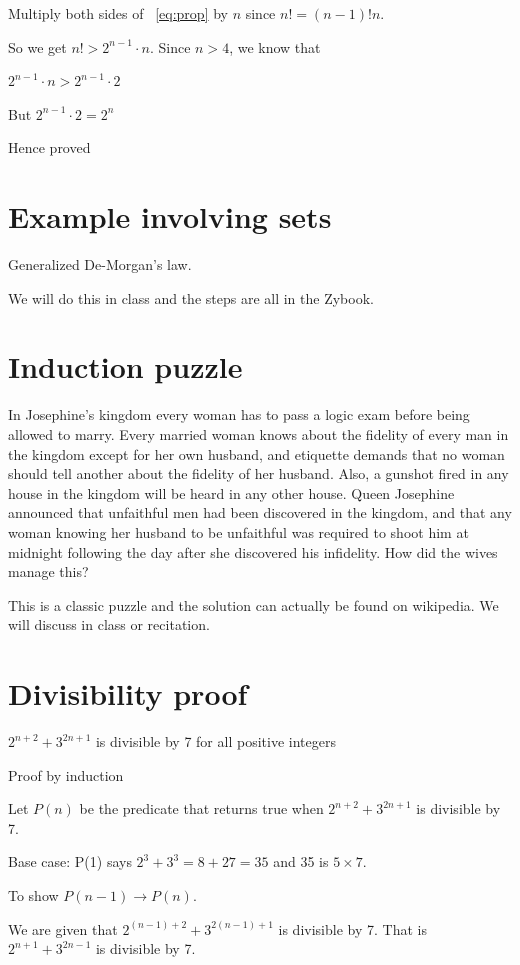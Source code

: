 \documentclass[12pt]{article}
\begin{document}
Multiply both sides of ~\ref{eq:prop} by $n$ since $n! = (n-1)!n$.

So we get $n! > 2^{n-1} \cdot n$. Since $n >4$, we know that 

$2^{n-1} \cdot n > 2^{n-1} \cdot 2$ 

But $2^{n-1} \cdot 2 = 2^n$

Hence proved

\section*{Example involving sets}

Generalized De-Morgan's law.

We will do this in class and the steps are all in the Zybook.

\section*{Induction puzzle}

 In Josephine's kingdom every woman has to pass a logic exam before being allowed to marry. Every married woman knows about the fidelity of every man in the kingdom except for her own husband, and etiquette demands that no woman should tell another about the fidelity of her husband. Also, a gunshot fired in any house in the kingdom will be heard in any other house. Queen Josephine announced that unfaithful men had been discovered in the kingdom, and that any woman knowing her husband to be unfaithful was required to shoot him at midnight following the day after she discovered his infidelity. How did the wives manage this?
 
This is a classic puzzle and the solution can actually be found on wikipedia. We will discuss in class or recitation.

\section*{Divisibility proof}

$2^{n+2} + 3^{2n+1}$ is divisible by 7 for all positive integers

Proof by induction

Let $P(n)$ be the predicate that returns true when $2^{n+2} + 3^{2n+1}$ is divisible by 7.

Base case: P(1) says $2^3 + 3^3 = 8 + 27 = 35$ and 35 is $5 \times 7$.

To show $P(n-1) \rightarrow P(n)$.

We are given that $2^{(n-1) + 2} + 3^{2(n-1)+1}$ is divisible by 7. That is $2^{n+1} + 3^{2n-1}$ is divisible by 7.
\end{document}
